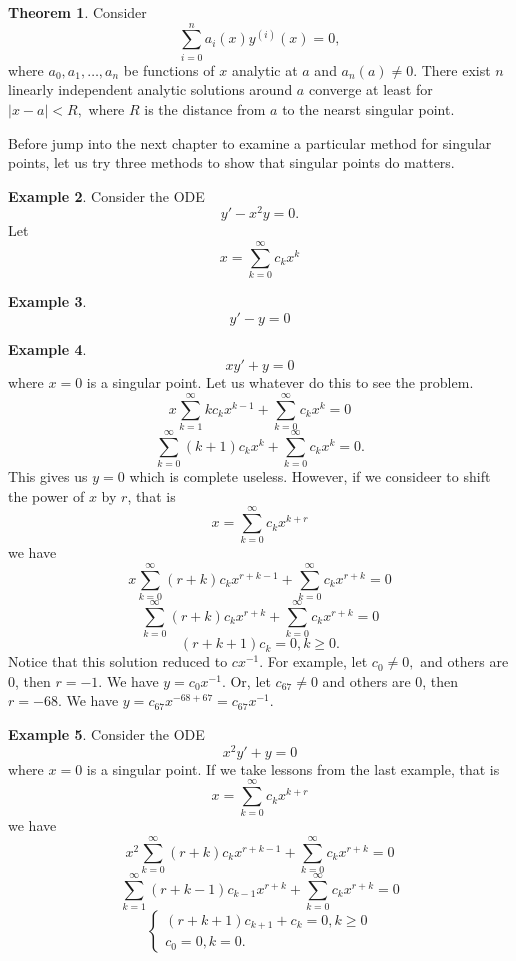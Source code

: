 \documentclass[12pt,a4paper]{report}
\theoremstyle{definition}
\newtheorem{theorem}{Theorem}[section]
\newtheorem{example}[theorem]{Example}
\theoremstyle{remark}
\begin{document}
\begin{theorem}
    Consider 
    \[\sum_{i = 0}^{n} a_i(x)y^{(i)}(x) = 0,\]
    where
    $a_0, a_1, \ldots, a_n$ be functions of $x$ analytic at $a$ and $a_n(a) \neq 0$. 
    There exist $n$ linearly independent analytic solutions around $a$ converge at least for $|x - a| < R,$ where $R$ is the distance from $a$ to the nearst singular point.
\end{theorem}

Before jump into the next chapter to examine a particular method for singular points, let us try three methods to show that singular points do matters.

\begin{example}
    Consider the ODE
    \[y' - x^2y = 0.\]
    Let
    \[x = \sum_{k = 0}^{\infty} c_k x^{k}\]
\end{example}

\begin{example}
    \[y' - y = 0\]
\end{example}



\begin{example}
    \[xy' + y = 0\]
    where $x = 0$ is a singular point. Let us whatever do this to see the problem.
    \[x \sum_{k = 1}^{\infty}kc_kx^{k - 1} + \sum_{k = 0}^{\infty} c_k x^{k} = 0\]
    \[\sum_{k = 0}^{\infty}{(k + 1)}c_{k}x^{k} + \sum_{k = 0}^{\infty} c_k x^{k} = 0.\]
    This gives us $y = 0$ which is complete useless. However, if we consideer to shift the power of $x$ by $r$, that is
    \[x = \sum_{k = 0}^{\infty} c_k x^{k + r}\]
    we have
    \[x \sum_{k = 0}^{\infty}{(r + k)}c_kx^{r + k - 1} + \sum_{k = 0}^{\infty} c_k x^{r + k} = 0\]
    \[\sum_{k = 0}^{\infty}(r + k)c_{k}x^{r + k} + \sum_{k = 0}^{\infty} c_k x^{r + k} = 0\]
    \[(r + k + 1)c_k = 0, k \geq 0.\]
    Notice that this solution reduced to $cx^{-1}.$ For example, let $c_0 \neq 0,$ and others are $0$, then $r = -1$. We have $y = c_0 x^{-1}$. Or, let $c_{67} \neq 0$ and others are $0$, then $r = -68.$ We have $y = c_{67}x^{-68 + 67} = c_{67} x^{-1}.$
\end{example}

\begin{example}
    Consider the ODE
    \[x^2y' + y = 0\]
    where $x = 0$ is a singular point. If we take lessons from the last example, that is
    \[x = \sum_{k = 0}^{\infty} c_k x^{k + r}\]
    we have
    \[x^2 \sum_{k = 0}^{\infty}{(r + k)}c_kx^{r + k - 1} + \sum_{k = 0}^{\infty} c_k x^{r + k} = 0\]
    \[\sum_{k = 1}^{\infty}(r + k - 1)c_{k - 1}x^{r + k} + \sum_{k = 0}^{\infty} c_k x^{r + k} = 0\]
    \[
    \begin{cases}
        (r + k + 1)c_{k + 1} + c_k = 0, k \geq 0\\
        c_0 = 0, k = 0.
    \end{cases}
    \]
\end{example}
\end{document}
